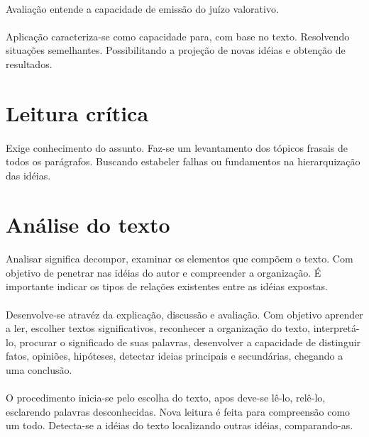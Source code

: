 \paragraph{}
Avaliação entende a capacidade de emissão do juízo valorativo.

\paragraph{}
Aplicação caracteriza-se como capacidade para, com base no texto. Resolvendo situações semelhantes. Possibilitando a projeção de novas idéias e obtenção de resultados.

\section{Leitura crítica}

\paragraph{}
Exige conhecimento do assunto. Faz-se um levantamento dos tópicos frasais de todos os parágrafos. Buscando estabeler falhas ou fundamentos na hierarquização das idéias.

\section{Análise do texto}

\paragraph{}
Analisar significa decompor, examinar os elementos que compõem o texto. Com objetivo de penetrar nas idéias do autor e compreender a organização. É importante indicar os tipos de relações existentes entre as idéias expostas.

\paragraph{}
Desenvolve-se atravéz da explicação, discussão e avaliação. Com objetivo aprender a ler, escolher textos significativos, reconhecer a organização do texto, interpretá-lo, procurar o significado de suas palavras, desenvolver a capacidade de distinguir fatos, opiniões, hipóteses, detectar ideias principais e secundárias, chegando a uma conclusão.

\paragraph{}
O procedimento inicia-se pelo escolha do texto, apos deve-se lê-lo, relê-lo, esclarendo palavras desconhecidas. Nova leitura é feita para compreensão como um todo. Detecta-se a idéias do texto localizando outras idéias, comparando-as.

